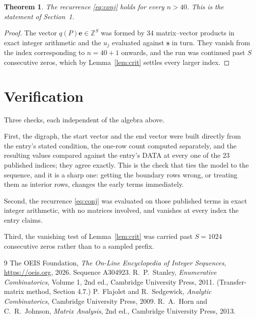 \documentclass[11pt,a4paper]{article}
\theoremstyle{plain}
\newtheorem{theorem}{Theorem}
\theoremstyle{definition}
\begin{document}
\begin{theorem}
The recurrence \eqref{eq:conj} holds for every $n>40$. This is the statement of
Section~1.
\end{theorem}

\begin{proof}
The vector $q(P)\mathbf{e}\in\mathbb{Z}^{S}$ was formed by $34$ matrix--vector
products in exact integer arithmetic and the $u_j$ evaluated against $\mathbf{s}$ in turn.
They vanish from the index corresponding to $n=40+1$ onwards, and the run was continued
past $S$ consecutive zeros, which by Lemma~\ref{lem:crit} settles every larger index.
\end{proof}

\section{Verification}

Three checks, each independent of the algebra above.

First, the digraph, the start vector and the end vector were built directly from the
entry's stated condition, the one-row count computed separately, and the resulting values
compared against the entry's DATA at every one of the $23$ published indices; they
agree exactly. This is the check that ties the model to the sequence, and it is a sharp one:
getting the boundary rows wrong, or treating them as interior rows, changes the early terms
immediately.

Second, the recurrence \eqref{eq:conj} was evaluated on those published terms in exact
integer arithmetic, with no matrices involved, and vanishes at every index the entry claims.

Third, the vanishing test of Lemma~\ref{lem:crit} was carried past $S=1024$ consecutive
zeros rather than to a sampled prefix.

\begin{thebibliography}{9}
 The OEIS Foundation, \emph{The On-Line Encyclopedia of Integer
Sequences}, \url{https://oeis.org}, 2026. Sequence A304923.
 R.~P.~Stanley, \emph{Enumerative Combinatorics}, Volume 1, 2nd ed.,
Cambridge University Press, 2011. (Transfer-matrix method, Section 4.7.)
 P.~Flajolet and R.~Sedgewick, \emph{Analytic Combinatorics}, Cambridge
University Press, 2009.
 R.~A.~Horn and C.~R.~Johnson, \emph{Matrix Analysis}, 2nd ed., Cambridge
University Press, 2013.
\end{thebibliography}
\end{document}
